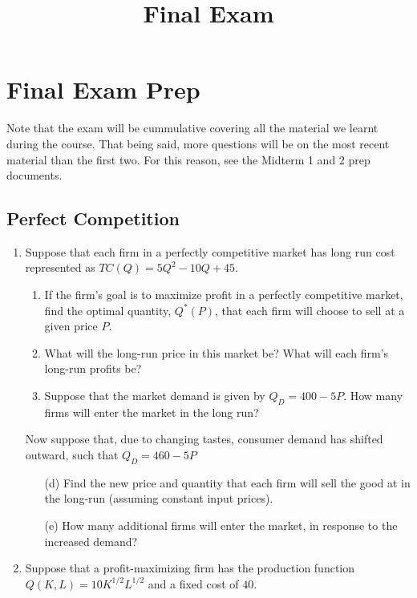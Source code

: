 \documentclass[11pt]{article}
\title{Final Exam}
\begin{document}
  
\section*{Final Exam Prep}

Note that the exam will be cummulative covering all the material we learnt during the course. That being said, more questions will be on the most recent material than the first two. For this reason, see the Midterm 1 and 2 prep documents.

\subsection*{Perfect Competition}

\begin{enumerate}
  \item Suppose that each firm in a perfectly competitive market has long run cost represented as $TC(Q) = 5Q^2 - 10Q + 45$.

  \begin{enumerate}
    \item If the firm's goal is to maximize profit in a perfectly competitive market, find the optimal quantity, $Q^*(P)$, that each firm will choose to sell at a given price $P$.

    \item What will the long-run price in this market be? What will each firm's long-run profits be?

    \item Suppose that the market demand is given by $Q_D = 400 - 5P$. How many firms will enter the market in the long run?
    
  \end{enumerate}

  Now suppose that, due to changing tastes, consumer demand has shifted outward, such that $Q_D = 460 - 5P$
  \begin{enumerate}
    \item[(d)] Find the new price and quantity that each firm will sell the good at in the long-run (assuming constant input prices).

    \item[(e)] How many additional firms will enter the market, in response to the increased demand?
  \end{enumerate}

  \item Suppose that a profit-maximizing firm has the production function $Q(K, L) = 10 K^{1/2} L^{1/2}$ and a fixed cost of $40$.


\end{enumerate}
\end{document}
